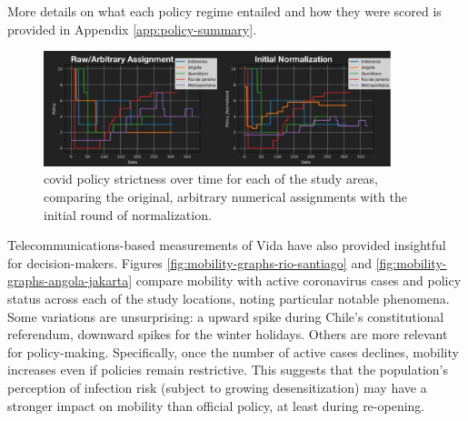 More details on what each policy regime entailed and how they were scored is provided in Appendix \ref{app:policy-summary}. 

\begin{figure}[!htb]
\centering
\includegraphics[width=0.9\textwidth]{Figures/chap5/policy-comparison.png}
\caption[COVID-19 Policy Strictness Over Time]{\ac{covid} policy strictness over time for each of the study areas, comparing the original, arbitrary numerical assignments with the initial round of normalization.}
\label{fig:policy-comparison}
\end{figure}

Telecommunications-based measurements of Vida have also provided insightful for decision-makers. Figures \ref{fig:mobility-graphs-rio-santiago} and \ref{fig:mobility-graphs-angola-jakarta} compare mobility with active coronavirus cases and policy status across each of the study locations, noting particular notable phenomena. Some variations are unsurprising: a upward spike during Chile's constitutional referendum, downward spikes for the winter holidays. Others are more relevant for policy-making. Specifically, once the number of active cases declines, mobility increases even if policies remain restrictive. This suggests that the population's perception of infection risk (subject to growing desensitization) may have a stronger impact on mobility than official policy, at least during re-opening.

\clearpage


